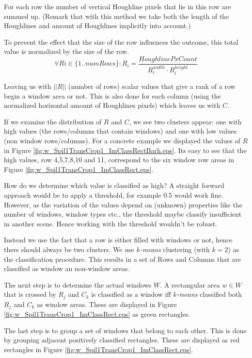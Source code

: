 For each row the number of vertical Houghline pixels that lie in this row are summed up.
(Remark that with this method we take both the length of the Houghlines and amount of Houghlines 
implicitly into account.)

To prevent the effect that the size of the row influences the outcome, this total value
is normalized by the size of the row.
\[\forall Ri\in \{1..numRows\} : R_i = \frac{HoughlinePxCount}{R_i^{width} \cdot R_i^{height}}\]

Leaving us with $||R||$ (number of rows) scalar values that give a rank of a row begin a window area or not.
This is also done for each column (using the normalized horizontal amount of
Houghlines pixels) which leaves us with $C$.

If we examine the distribution of $R$ and $C$, we see two clusters appear: one with
high values (the rows/columns that contain windows) and one with low values (non window
rows/columns). For a concrete example we displayed the values of $R$ in Figure \ref{fig:w_Spil1TransCrop1_ImClassRectBarh.eps}.
Its easy to see that the high values, row 4,5,7,8,10 and 11, correspond to the
six window row areas in Figure \ref{fig:w_Spil1TransCrop1_ImClassRect.eps}.

How do we determine which value is classified as high?  A straight forward
approach would be to apply a threshold, for example 0.5 would work fine.
However, as the variation of the values depend on (unknown) properties like the
number of windows, window types etc., the threshold maybe classify insufficient
in another scene.  Hence working with the threshold wouldn't be robust. 

Instead we use the fact that a row is either filled with windows or not, hence
there should always be two clusters.  We use \emph{$k$-means} clustering (with
$k=2$) as the classification procedure.
This results in a set of Rows and Columns that are classified as window an
non-window areas.

The next step is to determine the actual windows $W$.
A rectangular area $w\in W$ that is crossed by $R_j$ and $C_k$ is classified as a
window iff \emph{$k$-means} classified both $R_j$ and $C_k$ as window areas. These are displayed in 
 Figure \ref{fig:w_Spil1TransCrop1_ImClassRect.eps} as green rectangles.

The last step is to group a set of windows that belong to each other. This is done by 
grouping adjacent positively classified rectangles. These are displayed as red
rectangles in Figure \ref{fig:w_Spil1TransCrop1_ImClassRect.eps}.

